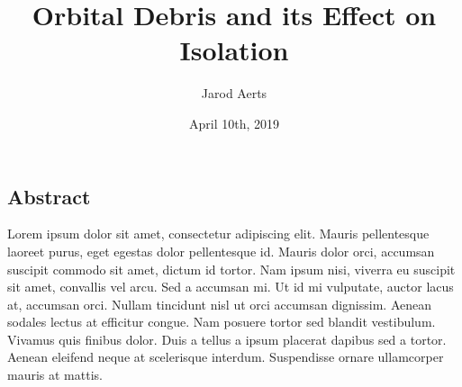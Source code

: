 \documentclass[12pt]{article}
\author{Jarod Aerts\vspace{-2ex}%
}
\date{April 10th, 2019\vspace{-3ex}}
\title{Orbital Debris and its Effect on Isolation\vspace{-2ex}%
}
\begin{document}
\maketitle

\begin{center}
	\section*{Abstract} \label{abstract}
	Lorem ipsum dolor sit amet, consectetur adipiscing elit. Mauris pellentesque laoreet purus, eget egestas dolor pellentesque id. Mauris dolor orci, accumsan suscipit commodo sit amet, dictum id tortor. Nam ipsum nisi, viverra eu suscipit sit amet, convallis vel arcu. Sed a accumsan mi. Ut id mi vulputate, auctor lacus at, accumsan orci. Nullam tincidunt nisl ut orci accumsan dignissim. Aenean sodales lectus at efficitur congue. Nam posuere tortor sed blandit vestibulum. Vivamus quis finibus dolor. Duis a tellus a ipsum placerat dapibus sed a tortor. Aenean eleifend neque at scelerisque interdum. Suspendisse ornare ullamcorper mauris at mattis.

\end{center}
\end{document}
